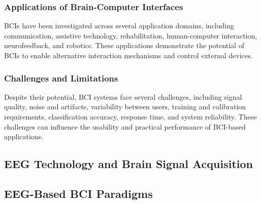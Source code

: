 
\subsubsection{Applications of Brain-Computer Interfaces}

BCIs have been investigated across several application domains, including communication, assistive technology, rehabilitation, human-computer interaction, neurofeedback, and robotics. These applications demonstrate the potential of BCIs to enable alternative interaction mechanisms and control external devices.

\subsubsection{Challenges and Limitations}

Despite their potential, BCI systems face several challenges, including signal quality, noise and artifacts, variability between users, training and calibration requirements, classification accuracy, response time, and system reliability. These challenges can influence the usability and practical performance of BCI-based applications.

\subsection{EEG Technology and Brain Signal Acquisition}


\subsection{EEG-Based BCI Paradigms}



